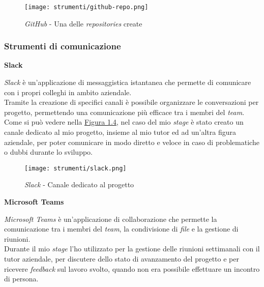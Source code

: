 \begin{figure}[H]
    \label{fig:github} 
    \centering
    \texttt{[image: strumenti/github-repo.png]}
    \caption{\textit{GitHub} - Una delle \textit{repositories} create}
\end{figure}

\pagebreak

\subsubsection{Strumenti di comunicazione}
\label{sez:strumenti-comunicazione}


\noindent \textbf{Slack\\}

\noindent \textit{Slack} è un'applicazione di messaggistica istantanea che permette di comunicare con i propri colleghi in ambito aziendale. \\
Tramite la creazione di specifici canali è possibile organizzare le conversazioni per progetto, permettendo una comunicazione più efficace tra i membri del \textit{team}.\\
Come si può vedere nella {\hyperref[fig:slack]{Figura 1.4}}, nel caso del mio \textit{stage} è stato creato un canale dedicato al mio progetto, insieme al mio tutor ed ad un'altra figura aziendale, 
per poter comunicare in modo diretto e veloce in caso di problematiche o dubbi durante lo sviluppo.

\begin{figure}[H]
    \label{fig:slack} 
    \centering
    \texttt{[image: strumenti/slack.png]}
    \caption{\textit{Slack} - Canale dedicato al progetto}
\end{figure}

\noindent \textbf{Microsoft Teams\\}

\noindent \textit{Microsoft Teams} è un'applicazione di collaborazione che permette la comunicazione tra i membri del \textit{team}, la condivisione di \textit{file} e la gestione di riunioni.\\
Durante il mio \textit{stage} l'ho utilizzato per la gestione delle riunioni settimanali con il tutor aziendale, per discutere dello stato di avanzamento del progetto e per ricevere \textit{feedback} sul lavoro svolto, quando
non era possibile effettuare un incontro di persona.
